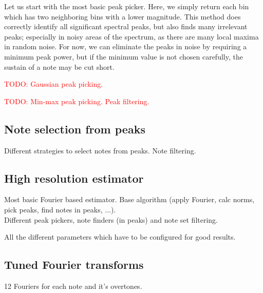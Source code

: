 \documentclass[10pt,twocolumn]{article}
\begin{document}
Let us start with the most basic peak picker. Here, we simply return each bin which has two neighboring bins with a lower magnitude. This method does correctly identify all significant spectral peaks, but also finds many irrelevant peaks; especially in noisy areas of the spectrum, as there are many local maxima in random noise. For now, we can eliminate the peaks in noise by requiring a minimum peak power, but if the minimum value is not chosen carefully, the sustain of a note may be cut short.

\textcolor{red}{TODO: Gaussian peak picking.}

\textcolor{red}{TODO: Min-max peak picking. Peak filtering.}

\subsection{Note selection from peaks}
Different strategies to select notes from peaks. Note filtering.

\subsection{High resolution estimator}  \label{sec:highrespitch}
Most basic Fourier based estimator. Base algorithm (apply Fourier, calc norms, pick peaks, find notes in peaks, ...).\\
Different peak pickers, note finders (in peaks) and note set filtering.

All the different parameters which have to be configured for good results.

\subsection{Tuned Fourier transforms}
12 Fouriers for each note and it's overtones.
\end{document}
